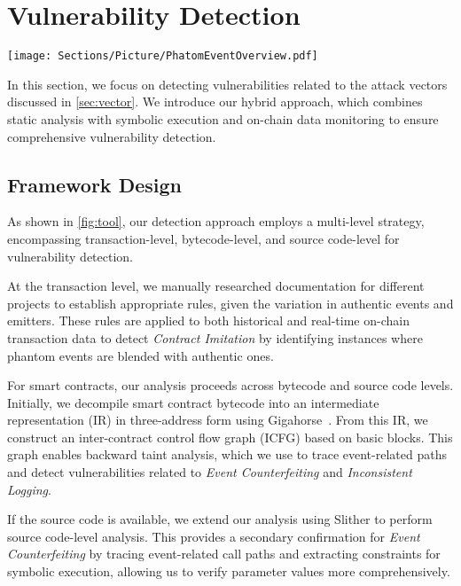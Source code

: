 \section{Vulnerability Detection}\label{sec:detection}

\begin{figure*}[t]
  \centering
  \texttt{[image: Sections/Picture/PhatomEventOverview.pdf]}
  \caption{The architecture of \tool.}
  \label{fig:tool}
\end{figure*}

In this section, we focus on detecting vulnerabilities related to the attack vectors discussed in
\cref{sec:vector}. We introduce our hybrid approach, which combines static analysis with symbolic
execution and on-chain data monitoring to ensure comprehensive vulnerability detection.

\subsection{\tool Framework Design}

As shown in \cref{fig:tool}, our detection approach employs a multi-level strategy, encompassing
transaction-level, bytecode-level, and source code-level for vulnerability detection.

At the transaction level, we manually researched documentation for different projects to establish appropriate rules, given the variation in authentic events and emitters. These rules are applied to both historical and real-time on-chain transaction data to detect \emph{Contract Imitation} by identifying instances where phantom events are blended with authentic ones.

For smart contracts, our analysis proceeds across bytecode and source code levels. Initially, we decompile smart contract bytecode into an intermediate representation (IR) in three-address form using Gigahorse~\cite{Gigahorse}. From this IR, we construct an inter-contract control flow graph (ICFG) based on basic blocks. This graph enables backward taint analysis, which we use to trace event-related paths and detect vulnerabilities related to \emph{Event Counterfeiting} and \emph{Inconsistent Logging}.

If the source code is available, we extend our analysis using Slither to perform source code-level analysis. This provides a secondary confirmation for \emph{Event Counterfeiting} by tracing event-related call paths and extracting constraints for symbolic execution, allowing us to verify parameter values more comprehensively.


